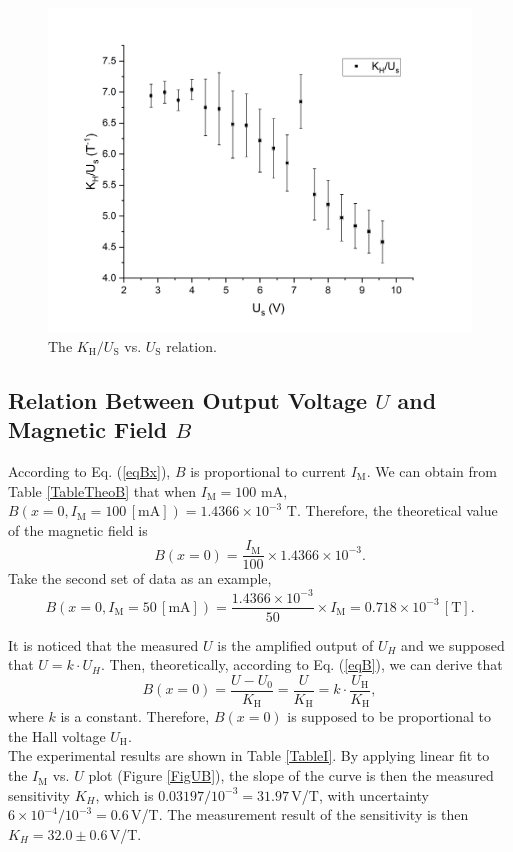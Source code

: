 \documentclass{article}
\begin{document}
\begin{figure}[H]
\centering
\includegraphics[scale=0.4]{plot1.png}
\caption{The $K_\text{H}/U_\text{S}$ vs. $U_\text{S}$ relation.}\label{FigKU}
\end{figure}

	\subsection{Relation Between Output Voltage $U$ and Magnetic Field $B$}\label{SecUB}
	
According to Eq. (\ref{eqBx}), $B$ is proportional to current $I_\text{M}$. We can obtain from Table \ref{TableTheoB} that when $I_\text{M} = 100 \,\,\text{mA},$ $B(x=0,I_\text{M}=100\,[\text{mA}])=1.4366\times10^{-3}\,\,\text{T}.$ Therefore, 
the theoretical value of the magnetic field is $$B(x=0) = \frac{I_\text{M}}{100}\times 1.4366\times10^{-3}.$$
Take the second set of data as an example, 
$$B(x=0,I_\text{M}=50\,[\text{mA}]) = \frac{1.4366\times10^{-3}}{50}\times I_\text{M} = 0.718\times 10^{-3}\,[\text{T}].$$

It is noticed that the measured $U$ is the amplified output of $U_{H}$ and we supposed that $U = k \cdot U_{H}$. Then, theoretically, according to Eq. (\ref{eqB}), we can derive that
$$B(x=0) = \frac{U-U_0}{K_\text{H}} = \frac{U}{K_\text{H}} = k\cdot\frac{U_\text{H}}{K_\text{H}},$$
where $k$ is a constant. Therefore, $B(x=0)$ is supposed to be proportional to the Hall voltage $U_\text{H}$.\\

The experimental results are shown in Table \ref{TableI}. By applying linear fit to the $I_\text{M}$ vs. $U$ plot (Figure \ref{FigUB}), the slope of the curve is then the measured sensitivity $K_{H}$, which is $ 0.03197 / 10^{-3} = 31.97\,$V/T, with uncertainty $6 \times 10^{-4} / 10^{-3} = 0.6\,$V/T. The measurement result of the sensitivity is then $K_H = 32.0 \pm 0.6\,$V/T.
\end{document}
